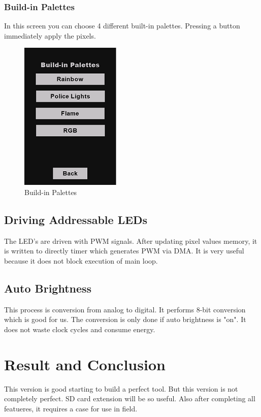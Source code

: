 \documentclass[conference]{IEEEtran}
\begin{document}
\subsubsection{Build-in Palettes}
In this screen you can choose 4 different built-in palettes. Pressing a button immediately apply the pixels.

\begin{figure}[htbp]
\centerline{\includegraphics{palettes.png}}
\caption{Build-in Palettes}
\label{fig}
\end{figure}

\newpage

\subsection{Driving Addressable LEDs}
The LED's are driven with PWM signals. After updating pixel values memory, it is written to directly timer which generates PWM via DMA. It is very useful because it does not block execution of main loop.

\subsection{Auto Brightness}
This process is conversion from analog to digital. It performs 8-bit conversion which is good for us. The conversion is only done if auto brightness is "on". It does not waste clock cycles and consume energy.

\section{Result and Conclusion}
This version is good starting to build a perfect tool. But this version is not completely perfect. SD card extension will be so useful. Also after completing all featueres, it requires a case for use in field. \\
\end{document}
